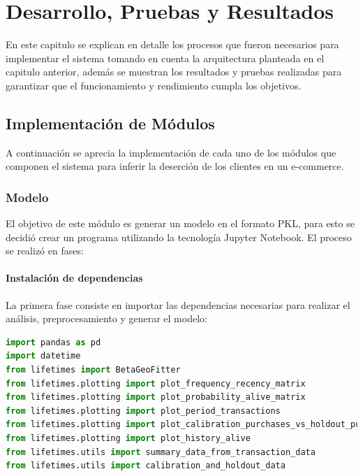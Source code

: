 
\chapter{Desarrollo, Pruebas y Resultados}

En este capitulo se explican en detalle los procesos que fueron necesarios para implementar el sistema tomando en cuenta la arquitectura planteada en el capitulo anterior, además se muestran los resultados y pruebas realizadas para garantizar que el funcionamiento y rendimiento cumpla los objetivos. 

\section{Implementación de Módulos}

	A continuación se aprecia la implementación de cada uno de los módulos que componen el sistema para inferir la deserción de los clientes en un e-commerce.
	
\subsection{Modelo}

El objetivo de este módulo es generar un modelo en el formato PKL, para esto se decidió crear un programa utilizando la tecnología Jupyter Notebook. El proceso se realizó en fases:

\subsubsection{Instalación de dependencias}

La primera fase consiste en importar las dependencias necesarias para realizar el análisis, preprocesamiento y generar el modelo:

\begin{lstlisting}[language=Python, caption=Importar dependencias en modelo.ipynb]
import pandas as pd
import datetime
from lifetimes import BetaGeoFitter
from lifetimes.plotting import plot_frequency_recency_matrix
from lifetimes.plotting import plot_probability_alive_matrix
from lifetimes.plotting import plot_period_transactions
from lifetimes.plotting import plot_calibration_purchases_vs_holdout_purchases
from lifetimes.plotting import plot_history_alive
from lifetimes.utils import summary_data_from_transaction_data
from lifetimes.utils import calibration_and_holdout_data
\end{lstlisting}

